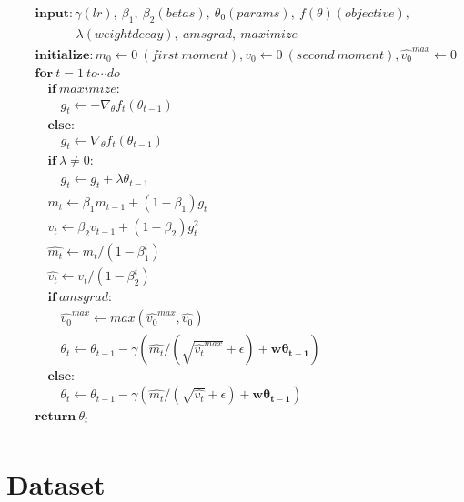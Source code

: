 \begin{eqnarray}
    && \textbf{input}: \gamma(lr),\ \beta_1,\ \beta_2(betas),\ \theta_0(params),\ f(\theta)(objective),\  \nonumber \\
    && \qquad \quad \ \lambda(weight decay),\ amsgrad,\ maximize \nonumber \\
    && \textbf{initialize}: m_0 \leftarrow 0\ (first\ moment), v_0 \leftarrow 0\ (second\ moment), \hat{v_0}^{max} \leftarrow 0  \nonumber \\
    && \textbf{for}\ t=1\ to \cdots do \nonumber \\ 
    && \quad \textbf{if}\ maximize: \nonumber \\ 
    && \quad \quad  g_t \leftarrow -\nabla_\theta f_t(\theta_{t-1}) \nonumber \\ 
    && \quad \textbf{else}: \nonumber \\ 
    && \quad \quad  g_t \leftarrow \nabla_\theta f_t(\theta_{t-1}) \nonumber \\ 
    && \quad \textbf{if}\ \lambda \neq 0: \nonumber \\ 
    && \quad \quad  g_t \leftarrow g_t + \lambda \theta_{t-1} \nonumber \\ 
    && \quad  m_t \leftarrow \beta_1 m_{t-1} + (1-\beta_1)g_t  \nonumber \\ 
    && \quad  v_t \leftarrow \beta_2 v_{t-1} + (1-\beta_2)g_t^2  \nonumber \\ 
    && \quad  \hat{m_t} \leftarrow m_t / (1-\beta_1^t)  \nonumber \\ 
    && \quad  \hat{v_t} \leftarrow v_t / (1-\beta_2^t)  \nonumber \\ 
    && \quad \textbf{if}\ amsgrad: \nonumber \\ 
    && \quad \quad \hat{v_0}^{max} \leftarrow max(\hat{v_0}^{max}, \hat{v_0}) \nonumber \\ 
    && \quad \quad \theta_t \leftarrow \theta_{t-1} - \gamma ( \hat{m_t} /(\sqrt{\hat{v_t}^{max}} + \epsilon) + \boldsymbol{w \theta_{t-1}} )\nonumber \\ 
    && \quad \textbf{else}: \nonumber \\ 
    && \quad \quad \theta_t \leftarrow \theta_{t-1} - \gamma (\hat{m_t} /(\sqrt{\hat{v_t}} + \epsilon) + \boldsymbol{w \theta_{t-1}} ) \nonumber \\ 
    && \textbf{return} \ \theta_t \nonumber \\ 
\end{eqnarray}

\section{Dataset}

